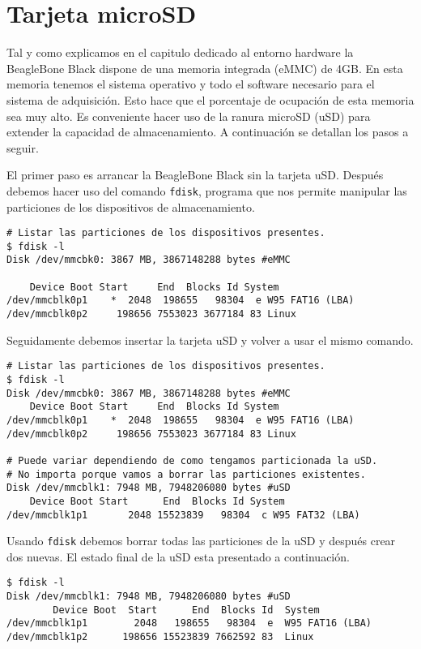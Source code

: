 	\section{Tarjeta microSD}
		Tal y como explicamos en el capitulo dedicado al entorno hardware la BeagleBone Black dispone de una memoria integrada (eMMC) de 4GB.
		En esta memoria tenemos el sistema operativo y todo el software necesario para el sistema de adquisición. Esto hace que el porcentaje
		de ocupación de esta memoria sea muy alto. Es conveniente hacer uso de la ranura microSD (uSD) para extender  la capacidad de
		almacenamiento. A continuación se detallan los pasos a seguir.
		\par
		El primer paso es arrancar la BeagleBone Black sin la tarjeta uSD. Después debemos hacer uso del comando \texttt{fdisk}, programa que
		nos permite manipular las particiones de los dispositivos de almacenamiento.
		\begin{lstlisting}[style=myBash]
# Listar las particiones de los dispositivos presentes.
$ fdisk -l
Disk /dev/mmcbk0: 3867 MB, 3867148288 bytes #eMMC

	Device Boot Start     End  Blocks Id System
/dev/mmcblk0p1    *  2048  198655   98304  e W95 FAT16 (LBA)
/dev/mmcblk0p2     198656 7553023 3677184 83 Linux
		\end{lstlisting}
		Seguidamente debemos insertar la tarjeta uSD y volver a usar el mismo comando.
		\begin{lstlisting}[style=myBash]
# Listar las particiones de los dispositivos presentes.
$ fdisk -l
Disk /dev/mmcbk0: 3867 MB, 3867148288 bytes #eMMC
	Device Boot Start     End  Blocks Id System
/dev/mmcblk0p1    *  2048  198655   98304  e W95 FAT16 (LBA)
/dev/mmcblk0p2     198656 7553023 3677184 83 Linux

# Puede variar dependiendo de como tengamos particionada la uSD.
# No importa porque vamos a borrar las particiones existentes.
Disk /dev/mmcblk1: 7948 MB, 7948206080 bytes #uSD
	Device Boot Start      End  Blocks Id System
/dev/mmcblk1p1       2048 15523839   98304  c W95 FAT32 (LBA)
		\end{lstlisting}
		Usando \texttt{fdisk} debemos borrar todas las particiones de la uSD y después crear dos nuevas. El estado final de la uSD esta
		presentado a continuación.
		\begin{lstlisting}[style=myBash]
$ fdisk -l
Disk /dev/mmcblk1: 7948 MB, 7948206080 bytes #uSD
        Device Boot  Start      End  Blocks Id  System
/dev/mmcblk1p1        2048   198655   98304  e  W95 FAT16 (LBA)
/dev/mmcblk1p2      198656 15523839 7662592 83  Linux
		\end{lstlisting}
